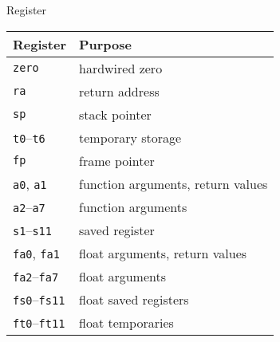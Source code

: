 \begin{frame}{Register}

	\begin{table}
		\centering
		\begin{tabular}{p{5.2cm}|p{5.2cm}}
			\rowcolor{gray!20} Register & Purpose                           \\
			\hline
			\texttt{zero}               & hardwired zero                    \\
			\texttt{ra}                 & return address                    \\
			\texttt{sp}                 & stack pointer                     \\
			\texttt{t0}--\texttt{t6}    & temporary storage                 \\
			\texttt{fp}                 & frame pointer                     \\
			\texttt{a0}, \texttt{a1}    & function arguments, return values \\
			\texttt{a2}--\texttt{a7}    & function arguments                \\
			\texttt{s1}--\texttt{s11}   & saved register                    \\
			\texttt{fa0}, \texttt{fa1}  & float arguments, return values    \\
			\texttt{fa2}--\texttt{fa7}  & float arguments                   \\
			\texttt{fs0}--\texttt{fs11} & float saved registers             \\
			\texttt{ft0}--\texttt{ft11} & float temporaries                 \\
		\end{tabular}
	\end{table}
\end{frame}

